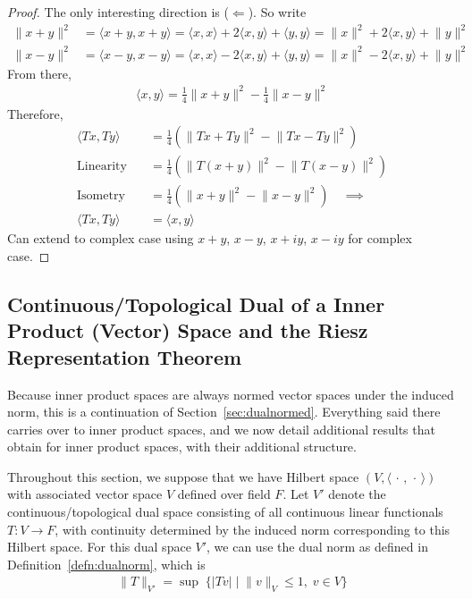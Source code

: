 \documentclass[12pt]{book}
\numberwithin{equation}{section} %
\theoremstyle{plain}
\theoremstyle{definition}
\theoremstyle{remark}
\newcommand{\ra}{\rightarrow}
\begin{document}
\begin{proof}
The only interesting direction is ($\Leftarrow$).
So write
\begin{align*}
  \lVert x+y\rVert^2
  &=
  \langle x+y, x+y\rangle
  =
  \langle x, x\rangle
  +
  2\langle x, y\rangle
  +
  \langle y, y\rangle
  =
  \lVert x\rVert^2
  +
  2\langle x, y\rangle
  +
  \lVert y\rVert^2
  \\
  \lVert x-y\rVert^2
  &=
  \langle x-y, x-y\rangle
  =
  \langle x, x\rangle
  -
  2\langle x, y\rangle
  +
  \langle y, y\rangle
  =
  \lVert x\rVert^2
  -
  2\langle x, y\rangle
  +
  \lVert y\rVert^2
\end{align*}
From there,
\begin{align*}
  \langle x,y\rangle
  =
  \frac{1}{4}
  \lVert x+y\rVert^2
  -
  \frac{1}{4}
  \lVert x-y\rVert^2
\end{align*}
Therefore,
\begin{align*}
  \langle Tx,Ty\rangle
  &=
  \frac{1}{4}
  \left(
  \lVert Tx+Ty\rVert^2
  -
  \lVert Tx-Ty\rVert^2
  \right)
  \\
  \text{Linearity}
  \quad
  &=
  \frac{1}{4}
  \left(
  \lVert T(x+y)\rVert^2
  -
  \lVert T(x-y)\rVert^2
  \right)
  \\
  \text{Isometry}
  \quad
  &=
  \frac{1}{4}
  \left(
  \lVert x+y\rVert^2
  -
  \lVert x-y\rVert^2
  \right)
  \quad\implies\quad
  \\
  \langle Tx,Ty\rangle
  &=
  \langle x,y\rangle
\end{align*}
Can extend to complex case using $x+y$, $x-y$, $x+iy$, $x-iy$ for
complex case.
\end{proof}


\clearpage
\subsection{Continuous/Topological Dual of a Inner Product (Vector)
Space and the Riesz Representation Theorem}

Because inner product spaces are always normed vector spaces under the
induced norm, this is a continuation of Section~\ref{sec:dualnormed}.
Everything said there carries over to inner product spaces, and we now
detail additional results that obtain for inner product spaces, with
their additional structure.

Throughout this section, we suppose that we have Hilbert space
$(V,\langle\,\cdot\,,\,\cdot\,\rangle)$ with associated vector space $V$
defined over field $F$.  Let $V'$ denote the continuous/topological dual
space consisting of all continuous linear functionals $T:V\ra F$, with
continuity determined by the induced norm corresponding to this Hilbert
space.  For this dual space $V'$, we can use the dual norm as defined in
Definition~\ref{defn:dualnorm}, which is
\begin{align*}
  \lVert
  T
  \rVert_{V'}
  =
  \sup
  \;
  \big\{
  |Tv|
  \;\big|\;
  \lVert v\rVert_V\leq 1,
  \;
  v\in V
  \big\}
\end{align*}
\end{document}
